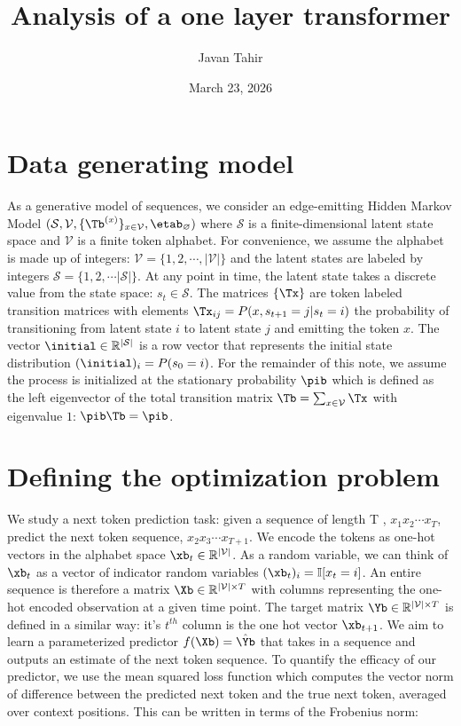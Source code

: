 \documentclass{article}
\title{Analysis of a one layer transformer}
\author{Javan Tahir}
\date{March 23, 2026}
\begin{document}
\maketitle

\section{Data generating model}
As a generative model of sequences, we consider an edge-emitting Hidden Markov Model $(\mathcal{S}, \mathcal{V}, \{ \Tb^{(x)}\}_{{x \in \mathcal{V}}}, \etab_{\varnothing})$ where $\mathcal{S}$ is a finite-dimensional latent state space and $\mathcal{V}$ is a finite token alphabet. For convenience, we assume the alphabet is made up of integers: $\mathcal{V} = \{1, 2, \cdots, |\mathcal{V}|\}$ and the latent states are labeled by integers $\mathcal{S} = \{1,2,\cdots |\mathcal{S}|\}$. At any point in time, the latent state takes a discrete value from the state space: $s_t \in \mathcal{S}$. The matrices $\{\Tx\}$ are token labeled transition matrices with elements $\Tx_{ij} = P(x, s_{t+1} = j | s_t = i)$ the probability of transitioning from latent state $i$ to latent state $j$ and emitting the token $x$. The vector $\initial \in \mathbb{R}^{|\mathcal{S}|}$ is a row vector that represents the initial state distribution $(\initial)_i = P(s_0 = i)$. For the remainder of this note, we assume the process is initialized at the stationary probability $\pib$ which is defined as the left eigenvector of the total transition matrix $\Tb = \sum_{x\in \mathcal{V}} \Tx$ with eigenvalue $1$: $\pib \Tb = \pib$. 

\section{Defining the optimization problem}
We study a next token prediction task: given a sequence of length T , $x_1x_2\cdots x_T$, predict the next token sequence, $x_2x_3\cdots x_{T+1}$. We encode the tokens as one-hot vectors in the alphabet space $\xb_t \in \mathbb{R}^{|\mathcal{V}|}$. As a random variable, we can think of $\xb_t$ as a vector of indicator random variables $(\xb_t)_i = \mathbb{I}[x_t = i]$. An entire sequence is therefore a matrix $\Xb \in \mathbb{R}^{|\mathcal{V}| \times T}$ with columns representing the one-hot encoded observation at a given time point. The target matrix $\Yb \in \mathbb{R}^{|\mathcal{V}| \times T}$ is defined in a similar way: it's $t^{th}$ column is the one hot vector $\xb_{t+1}$. We aim to learn a parameterized predictor $f(\Xb) = \hat{\Yb}$ that takes in a sequence and outputs an estimate of the next token sequence. To quantify the efficacy of our predictor, we use the mean squared loss function which computes the vector norm of difference between the predicted next token and the true next token, averaged over context positions. This can be written in terms of the Frobenius norm: 
\end{document}
